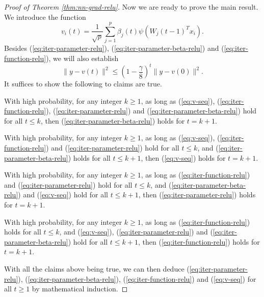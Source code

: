 \begin{proof}[Proof of Theorem \ref{thm:nn-grad-relu}]
Now we are ready to prove the main result. We introduce the function
$$v_i(t)=\frac{1}{\sqrt{p}}\sum_{j=1}^p\beta_j(t)\psi(W_j(t-1)^Tx_i).$$
Besides (\ref{eq:iter-parameter-relu}), (\ref{eq:iter-parameter-beta-relu}) and (\ref{eq:iter-function-relu}), we will also establish
\begin{equation}
\|y-v(t)\|^2 \leq \left(1-\frac{\gamma}{8}\right)^t\|y-v(0)\|^2. \label{eq:v-seq}
\end{equation}
It suffices to show the following to claims are true.
\begin{thm1}
With high probability, for any integer $k\geq 1$, as long as (\ref{eq:v-seq}), (\ref{eq:iter-function-relu}), (\ref{eq:iter-parameter-relu}) and (\ref{eq:iter-parameter-beta-relu}) hold for all $t\leq k$, then (\ref{eq:iter-parameter-beta-relu}) holds for $t=k+1$.
\end{thm1}
\begin{thm2}
With high probability, for any integer $k\geq 1$, as long as (\ref{eq:v-seq}), (\ref{eq:iter-function-relu}) and (\ref{eq:iter-parameter-relu}) hold for all $t\leq k$, and (\ref{eq:iter-parameter-beta-relu}) holds for all $t\leq k+1$, then (\ref{eq:v-seq}) holds for $t=k+1$.
\end{thm2}
\begin{thm3}
With high probability, for any integer $k\geq 1$, as long as (\ref{eq:iter-function-relu}) and (\ref{eq:iter-parameter-relu}) hold for all $t\leq k$, and (\ref{eq:iter-parameter-beta-relu}) and (\ref{eq:v-seq}) hold for all $t\leq k+1$, then (\ref{eq:iter-parameter-relu}) holds for $t=k+1$.
\end{thm3}
\begin{thm4}
With high probability, for any integer $k\geq 1$, as long as (\ref{eq:iter-function-relu}) holds for all $t\leq k$, and (\ref{eq:v-seq}), (\ref{eq:iter-parameter-relu}) and (\ref{eq:iter-parameter-beta-relu}) hold for all $t\leq k+1$, then (\ref{eq:iter-function-relu}) holds for $t=k+1$.
\end{thm4}
\noindent With all the claims above being true, we can then deduce (\ref{eq:iter-parameter-relu}), (\ref{eq:iter-parameter-beta-relu}), (\ref{eq:iter-function-relu}) and (\ref{eq:v-seq}) for all $t\geq 1$ by mathematical induction.


\end{proof}
